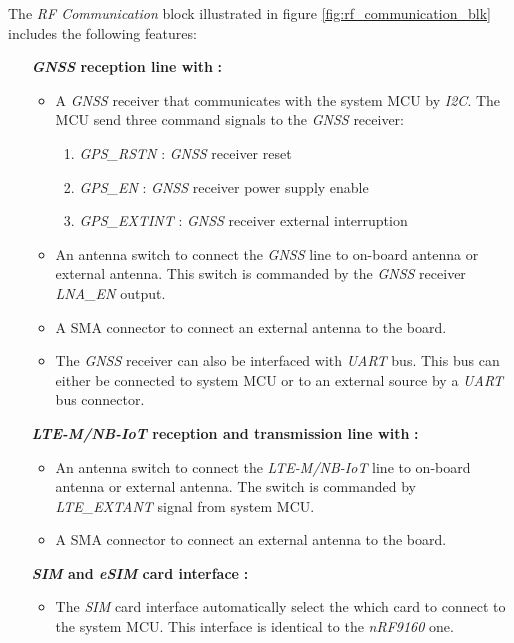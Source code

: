 \documentclass[report.tex]{subfiles}
\begin{document}
\pagebreak

\begin{flushleft}
The \textit{RF Communication} block illustrated in figure \ref{fig:rf_communication_blk} includes the following features:
\end{flushleft}
\begin{itemize}
\item [\quad\textbf{\textit{GNSS} reception line with}]\textbf{:}
\begin{itemize}
\item A \textit{GNSS} receiver that communicates with the system MCU by \textit{I2C}. The MCU send three command signals to the \textit{GNSS} receiver:
\begin{enumerate}
\item \textit{GPS\_RSTN} : \textit{GNSS} receiver reset
\item \textit{GPS\_EN} : \textit{GNSS} receiver power supply enable
\item \textit{GPS\_EXTINT} : \textit{GNSS} receiver external interruption
\end{enumerate}
\item An antenna switch to connect the \textit{GNSS} line to on-board antenna or external antenna. This switch is commanded by the \textit{GNSS} receiver \textit{LNA\_EN} output.
\item A SMA connector to connect an external antenna to the board.
\item The \textit{GNSS} receiver can also be interfaced with \textit{UART} bus. This bus can either be connected to system MCU or to an external source by a \textit{UART} bus connector.
\end{itemize}
\item [\quad\textbf{\textit{LTE-M/NB-IoT} reception and transmission line with}]\textbf{:}
\begin{itemize}
\item An antenna switch to connect the \textit{LTE-M/NB-IoT} line to on-board antenna or external antenna. The switch is commanded by \textit{LTE\_EXTANT} signal from system MCU.
\item A SMA connector to connect an external antenna to the board.
\end{itemize}
\item [\quad\textbf{\textit{SIM} and \textit{eSIM} card interface}]\textbf{:}
\begin{itemize}
\item The \textit{SIM} card interface automatically select the which card to connect to the system MCU. This interface is identical to the \textit{nRF9160} one. 
\end{itemize} 
\end{itemize}
\end{document}
